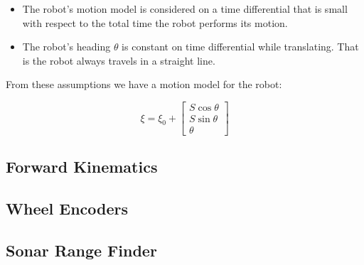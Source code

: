 \documentclass[main.tex]{subfiles}
\begin{document}
\begin{itemize}
\item The robot's motion model is considered on a time differential \delt that
is small with respect to the total time the robot performs its motion. 

\item The robot's heading $\theta$ is constant on time differential \delt while
translating. That is the robot always travels in a straight line.
\end{itemize}

From these assumptions we have a motion model for the robot:

\begin{equation}
\label{eq:motionState}
\xi = \xi_{0} +
\begin{bmatrix}
S\cos{\theta} \\
S\sin{\theta} \\
\theta
\end{bmatrix}
\end{equation}

\subsection{Forward Kinematics}

\subsection{Wheel Encoders}

\subsection{Sonar Range Finder}
\end{document}
